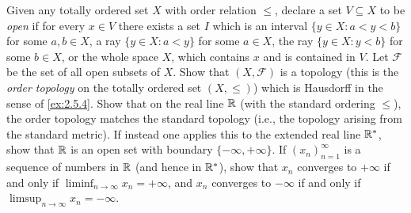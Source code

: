\begin{ex}\label{ex:2.5.5}
  Given any totally ordered set \(X\) with order relation \(\leq\), declare a set \(V \subseteq X\) to be \emph{open} if for every \(x \in V\) there exists a set \(I\) which is an interval \(\{y \in X : a < y < b\}\) for some \(a, b \in X\), a ray \(\{y \in X : a < y\}\) for some \(a \in X\), the ray \(\{y \in X : y < b\}\) for some \(b \in X\), or the whole space \(X\), which contains \(x\) and is contained in \(V\).
  Let \(\mathcal{F}\) be the set of all open subsets of \(X\).
  Show that \((X, \mathcal{F})\) is a topology (this is the \emph{order topology} on the totally ordered set \((X, \leq)\)) which is Hausdorff in the sense of \cref{ex:2.5.4}.
  Show that on the real line \(\mathbb{R}\) (with the standard ordering \(\leq\)), the order topology matches the standard topology (i.e., the topology arising from the standard metric).
  If instead one applies this to the extended real line \(\mathbb{R}^*\), show that \(\mathbb{R}\) is an open set with boundary \(\{-\infty, +\infty\}\).
  If \((x_n)_{n = 1}^\infty\) is a sequence of numbers in \(\mathbb{R}\) (and hence in \(\mathbb{R}^*\)), show that \(x_n\) converges to \(+\infty\) if and only if \(\liminf_{n \to \infty} x_n = +\infty\), and \(x_n\) converges to \(-\infty\) if and only if \(\limsup_{n \to \infty} x_n = -\infty\).
\end{ex}

